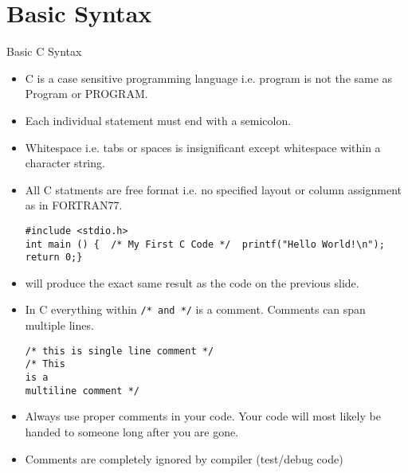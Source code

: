 \documentclass[10pt,t]{beamer}
\begin{document}
\section{Basic Syntax}
\begin{frame}{Basic C Syntax}
  \begin{itemize}
  \item C is a case sensitive programming language i.e. program is not the same as Program or PROGRAM.
  \item Each individual statement must end with a semicolon. 
  \item Whitespace i.e. tabs or spaces is insignificant except whitespace within a character string.
  \item All C statments are free format i.e. no specified layout or column assignment as in FORTRAN77.
    \begin{lstlisting}[basicstyle=\scriptsize\ttfamily]
#include <stdio.h>
int main () {  /* My First C Code */  printf("Hello World!\n");  return 0;}
    \end{lstlisting}
  \item[] will produce the exact same result as the code on the previous slide.
  \item In C everything within \lstinline[basicstyle=\scriptsize\ttfamily]|/* and */| is a comment. Comments can span multiple lines.
    \begin{lstlisting}[basicstyle=\scriptsize\ttfamily]
/* this is single line comment */
/* This
is a 
multiline comment */
    \end{lstlisting}
  \item Always use proper comments in your code. Your code will most likely be handed to someone long after you are gone.
  \item Comments are completely ignored by compiler (test/debug code)
  \end{itemize}
\end{frame}
\end{document}
